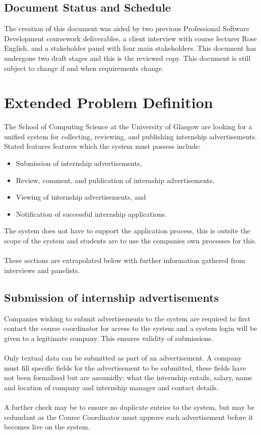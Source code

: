 \documentclass{l3deliverable}
\begin{document}
\subsection{Document Status and Schedule}

The creation of this document was aided by two previous Professional Software
Development coursework deliverables, a client interview with course
lecturer Rose English, and a stakeholder panel with four main stakeholders.
This document has undergone two draft stages and this is the reviewed copy. This document is still subject to change if and when requirements change.


\section{Extended Problem Definition}


The School of Computing Science at the University of Glasgow are looking for a unified system for 
collecting, reviewing, and publishing internship advertisements. Stated features features which the system must possess include: 
\begin{itemize}
\item Submission of internship advertisements,
\item Review, comment, and publication of internship advertisements,
\item Viewing of internship advertisements, and
\item Notification of successful internship applications.
\end{itemize}
The system does not have to support the application process, this is outsite the scope of the system and students are to use the companies own processes for this. \\ \\ 
These sections are extrapolated below with further information gathered from interviews and panelists.

\subsection{Submission of internship advertisements}
Companies wishing to submit advertisements to the system are required to first
contact the course coordinator for access to the system and a system login will be given to a legitimate company. This ensures validity of submissions.
\\ \\
Only textual data can be submitted as part of an advertisement. A company must fill specific fields for the advertisement to be submitted, these fields have not been formalised but are assumidly: what the internship entails, salary, name and location of company and internship manager and contact details.
\\ \\
A further check may be to ensure no duplicate entries to the system, but may be redundant as the Course Coordinator must approve each advertisement before it becomes live on the system.
\end{document}
